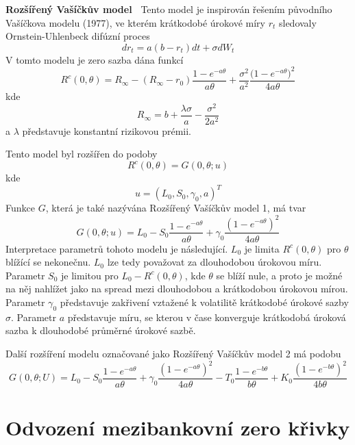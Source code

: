 \documentclass[a4paper]{book}
\begin{document}
\noindent \textbf{Rozšířený Vašíčkův model~} Tento model je inspirován řešením původního Vašíčkova modelu (1977), ve kterém krátkodobé úrokové míry $r_t$ sledovaly Ornstein-Uhlenbeck difúzní proces
\begin{equation*}
dr_t = a(b-r_t)dt + \sigma dW_t
\end{equation*}
V tomto modelu je zero sazba dána funkcí
\begin{equation*}
R^c(0,\theta) = R_{\infty} - (R_{\infty} - r_0)\frac{1 - e^{-a \theta}}{a \theta} + \frac{\sigma^2}{a^2}\frac{\Big(1 - e^{-a \theta}\Big)^2}{4a \theta}
\end{equation*}
kde
\begin{equation*}
R_{\infty} = b + \frac{\lambda \sigma}{a} - \frac{\sigma^2}{2a^2}
\end{equation*}
a $\lambda$ představuje konstantní rizikovou prémii.

Tento model byl rozšířen do podoby
\begin{equation*}
R^c(0,\theta) = G(0, \theta; u)
\end{equation*}
kde
\begin{equation*}
u = (L_0, S_0, \gamma_0, a)^T
\end{equation*}
Funkce $G$, která je také nazývána Rozšířený Vašíčkův model 1, má tvar
\begin{equation*}
G(0,\theta; u) = L_0 - S_0 \frac{1 - e^{-a\theta}}{a \theta} + \gamma_0 \frac{(1 - e^{-a \theta})^2}{4a \theta}
\end{equation*}
Interpretace parametrů tohoto modelu je následující. $L_0$ je limita $R^c(0,\theta)$ pro $\theta$ blížící se nekonečnu. $L_0$ lze tedy považovat za dlouhodobou úrokovou míru. Parametr $S_0$ je limitou pro $L_0 - R^c(0, \theta)$, kde $\theta$ se blíží nule, a proto je možné na něj nahlížet jako na spread mezi dlouhodobou a krátkodobou úrokovou mírou. Parametr $\gamma_0$ představuje zakřivení vztažené k volatilitě krátkodobé úrokové sazby $\sigma$. Parametr $a$ představuje míru, se kterou v čase konverguje krátkodobá úroková sazba k dlouhodobé průměrné úrokové sazbě.

Další rozšíření modelu označované jako Rozšířený Vašíčkův model 2 má podobu
\begin{equation*}
G(0, \theta; U) = L_0 - S_0 \frac{1 - e^{-a \theta}}{a \theta} + \gamma_0 \frac{(1 - e^{-a \theta})^2}{4a\theta} - T_0 \frac{1 - e^{-b \theta}}{b \theta} + K_0 \frac{(1 - e^{-b \theta})^2}{4b \theta}
\end{equation*}

\section{Odvození mezibankovní zero křivky}
\end{document}
